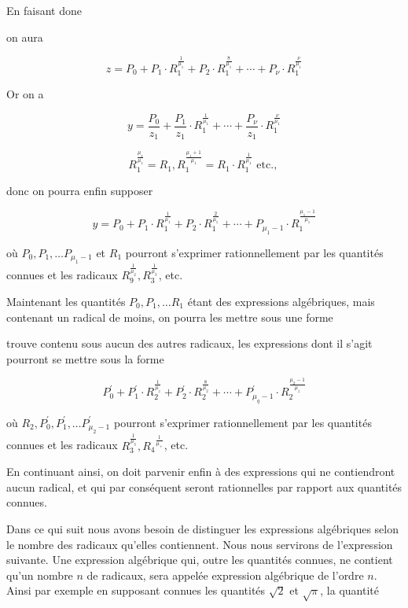 \documentclass{article}
\begin{document}
En faisant done

on aura

\[
z=P_{0}+P_{1} \cdot R_{1}^{\frac{1}{\mu_{1}}}+P_{2} \cdot R_{1}^{\frac{8}{\mu_{1}}}+\cdots+P_{\nu} \cdot R_{1}^{\frac{\nu}{\mu_{1}}}
\]

\(\mathrm{Or}\) on a

\[
y=\frac{P_{0}}{z_{1}}+\frac{P_{1}}{z_{1}} \cdot R_{1}^{\frac{1}{\mu_{1}}}+\cdots+\frac{P_{\nu}}{z_{1}} \cdot R_{1}^{\frac{\nu}{\mu_{1}}}
\]

\[
R_{1}^{\frac{\mu_{1}}{\mu_{1}}}=R_{1}, R_{1}^{\frac{\mu_{1}+1}{\mu_{1}}}=R_{1} \cdot R_{1}^{\frac{1}{\mu_{1}}} \text { etc., }
\]

donc on pourra enfin supposer

\[
y=P_{0}+P_{1} \cdot R_{1}^{\frac{1}{\mu_{1}}}+P_{2} \cdot R_{1}^{\frac{2}{\mu_{1}}}+\cdots+P_{\mu_{1}-1} \cdot R_{1}^{\frac{\mu_{1}-1}{\mu_{1}}}
\]

où \(P_{0}, P_{1}, \ldots P_{\mu_{1}-1}\) et \(R_{1}\) pourront s'exprimer rationnellement par les quantités connues et les radicaux \(R_{9}^{\frac{1}{\mu_{2}}}, R_{3}^{\frac{1}{\mu_{3}}}\), etc.

Maintenant les quantités \(P_{0}, P_{1}, \ldots R_{1}\) étant des expressions algébriques, mais contenant un radical de moins, on pourra les mettre sous une forme


trouve contenu sous aucun des autres radicaux, les expressions dont il s'agit pourront se mettre sous la forme

\[
P_{0}^{\prime}+P_{1}^{\prime} \cdot R_{2}^{\frac{1}{\mu_{z}}}+P_{2}^{\prime} \cdot R_{2}^{\frac{8}{\mu_{2}}}+\cdots+P_{\mu_{q}-1}^{\prime} \cdot R_{2}^{\frac{\mu_{2}-1}{\mu_{z}}}
\]

où \(R_{2}, P_{0}^{\prime}, P_{1}^{\prime}, \ldots P_{\mu_{2}-1}^{\prime}\) pourront s'exprimer rationnellement par les quantités connues et les radicaux \(R_{3}^{\frac{1}{\mu_{3}}},{R_{4}}^{\frac{1}{\mu_{+}}}\), etc.

En continuant ainsi, on doit parvenir enfin à des expressions qui ne contiendront aucun radical, et qui par conséquent seront rationnelles par rapport aux quantités connues.

Dans ce qui suit nous avons besoin de distinguer les expressions algébriques selon le nombre des radicaux qu'elles contiennent. Nous nous servirons de l'expression suivante. Une expression algébrique qui, outre les quantités connues, ne contient qu'un nombre \(n\) de radicaux, sera appelée expression algébrique de l'ordre \(n\). Ainsi par exemple en supposant connues les quantités \(\sqrt{2}\) et \(\sqrt{\pi}\), la quantité
\end{document}
